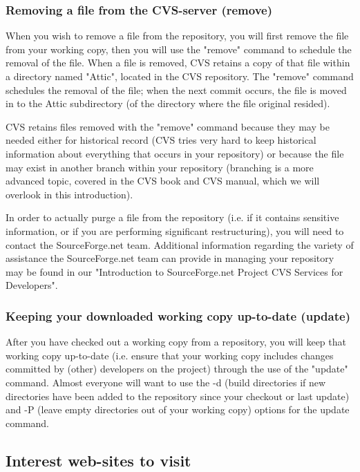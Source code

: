 \subsubsection{Removing a file from the CVS-server (remove)}

When you wish to remove a file from the repository, you will first remove the file from your working copy, then you will use the "remove" command to schedule the removal of the file. When a file is removed, CVS retains a copy of that file within a directory named "Attic", located in the CVS repository. The "remove" command schedules the removal of the file; when the next commit occurs, the file is moved in to the Attic subdirectory (of the directory where the file original resided).

CVS retains files removed with the "remove" command because they may be needed either for historical record (CVS tries very hard to keep historical information about everything that occurs in your repository) or because the file may exist in another branch within your repository (branching is a more advanced topic, covered in the CVS book and CVS manual, which we will overlook in this introduction).

In order to actually purge a file from the repository (i.e. if it contains sensitive information, or if you are performing significant restructuring), you will need to contact the SourceForge.net team. Additional information regarding the variety of assistance the SourceForge.net team can provide in managing your repository may be found in our "Introduction to SourceForge.net Project CVS Services for Developers".

\subsubsection{Keeping your downloaded working copy up-to-date (update)}

After you have checked out a working copy from a repository, you will keep that working copy up-to-date (i.e. ensure that your working copy includes changes committed by (other) developers on the project) through the use of the "update" command. Almost everyone will want to use the -d (build directories if new directories have been added to the repository since your checkout or last update) and -P (leave empty directories out of your working copy) options for the update command.

\subsection{Interest web-sites to visit}

